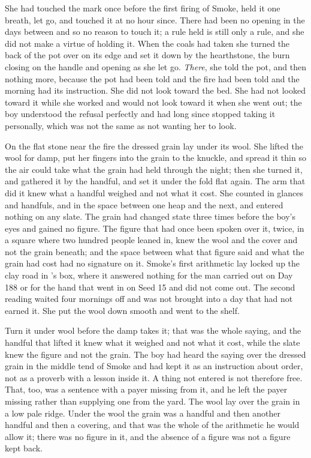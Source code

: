 She had touched the mark once before the first firing of Smoke, held it one breath, let go, and touched it at no hour since. There had been no opening in the days between and so no reason to touch it; a rule held is still only a rule, and she did not make a virtue of holding it. When the coals had taken she turned the back of the pot over on its edge and set it down by the hearthstone, the burn closing on the handle and opening as she let go. \emph{There}, she told the pot, and then nothing more, because the pot had been told and the fire had been told and the morning had its instruction. She did not look toward the bed. She had not looked toward it while she worked and would not look toward it when she went out; the boy understood the refusal perfectly and had long since stopped taking it personally, which was not the same as not wanting her to look.

\scenebreak

On the flat stone near the fire the dressed grain lay under its wool. She lifted the wool for damp, put her fingers into the grain to the knuckle, and spread it thin so the air could take what the grain had held through the night; then she turned it, and gathered it by the handful, and set it under the fold flat again. The arm that did it knew what a handful weighed and not what it cost. She counted in glances and handfuls, and in the space between one heap and the next, and entered nothing on any slate. The grain had changed state three times before the boy's eyes and gained no figure. The figure that had once been spoken over it, twice, in a square where two hundred people leaned in, knew the wool and the cover and not the grain beneath; and the space between what that figure said and what the grain had cost had no signature on it. Smoke's first arithmetic lay locked up the clay road in 's box, where it answered nothing for the man carried out on Day 188 or for the hand that went in on Seed 15 and did not come out. The second reading waited four mornings off and was not brought into a day that had not earned it. She put the wool down smooth and went to the shelf.

Turn it under wool before the damp takes it; that was the whole saying, and the handful that lifted it knew what it weighed and not what it cost, while the slate knew the figure and not the grain. The boy had heard the saying over the dressed grain in the middle tend of Smoke and had kept it as an instruction about order, not as a proverb with a lesson inside it. A thing not entered is not therefore free. That, too, was a sentence with a payer missing from it, and he left the payer missing rather than supplying one from the yard. The wool lay over the grain in a low pale ridge. Under the wool the grain was a handful and then another handful and then a covering, and that was the whole of the arithmetic he would allow it; there was no figure in it, and the absence of a figure was not a figure kept back.

